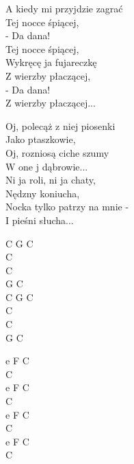 \begin{text}
A kiedy mi przyjdzie zagrać\\
Tej nocce śpiącej,\\
- Da dana!\\
Tej nocce śpiącej,\\
Wykręcę ja fujareczkę\\
Z wierzby płaczącej,\\
- Da dana!\\
Z wierzby płaczącej...

Oj, polecąż z niej piosenki\\
Jako ptaszkowie,\\
Oj, rozniosą ciche szumy\\
W one j dąbrowie...\\
Ni ja roli, ni ja chaty,\\
Nędzny koniucha,\\
Nocka tylko patrzy na mnie -\\
I pieśni słucha...
\end{text}
\begin{chord}
    C G C\\
    C\\
    C\\
    G C\\
    C G C\\
    C\\
    C\\
    G C

    e F C\\
    C\\
    e F C\\
    C\\
    e F C\\
    C\\
    e F C\\
    C
\end{chord}